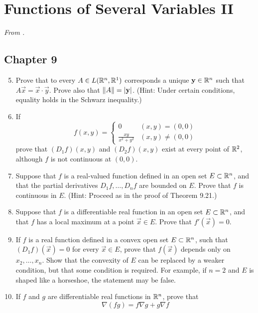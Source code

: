 \documentclass[../psets.tex]{subfiles}
\begin{document}
\section{Functions of Several Variables II}
\emph{From \textcite{bib:Rudin}.}
\subsection*{Chapter 9}
\begin{enumerate}[label={\textbf{\arabic*.}}]
    \setcounter{enumi}{4}
    \item {}Prove that to every $A\in L(\mathbb{R}^n,\mathbb{R}^1)$ corresponds a unique $\mathbf{y}\in\mathbb{R}^n$ such that $A\vec{x}=\vec{x}\cdot\vec{y}$. Prove also that $\norm{A}=|\mathbf{y}|$. (Hint: Under certain conditions, equality holds in the Schwarz inequality.)
    \item If
    \begin{equation*}
        f(x,y) =
        \begin{cases}
            0 & (x,y)=(0,0)\\
            \frac{xy}{x^2+y^2} & (x,y)\neq(0,0)
        \end{cases}
    \end{equation*}
    prove that $(D_1f)(x,y)$ and $(D_2f)(x,y)$ exist at every point of $\mathbb{R}^2$, although $f$ is not continuous at $(0,0)$.
    \item Suppose that $f$ is a real-valued function defined in an open set $E\subset\mathbb{R}^n$, and that the partial derivatives $D_1f,\dots,D_nf$ are bounded on $E$. Prove that $f$ is continuous in $E$. (Hint: Proceed as in the proof of Theorem 9.21.)
    \item Suppose that $f$ is a differentiable real function in an open set $E\subset\mathbb{R}^n$, and that $f$ has a local maximum at a point $\vec{x}\in E$. Prove that $f'(\vec{x})=0$.
    \item If $f$ is a real function defined in a convex open set $E\subset\mathbb{R}^n$, such that $(D_1f)(\vec{x})=0$ for every $\vec{x}\in E$, prove that $f(\vec{x})$ depends only on $x_2,\dots,x_n$. Show that the convexity of $E$ can be replaced by a weaker condition, but that some condition is required. For example, if $n=2$ and $E$ is shaped like a horseshoe, the statement may be false.
    \item If $f$ and $g$ are differentiable real functions in $\mathbb{R}^n$, prove that
    \begin{equation*}
        \nabla(fg) = f\nabla g+g\nabla f
    \end{equation*}

\end{enumerate}
\end{document}
